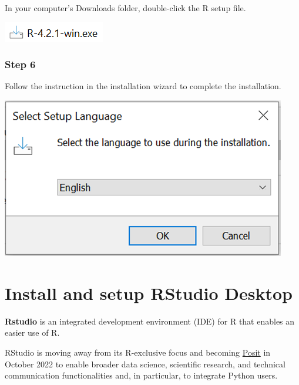 \documentclass[
  letterpaper,
  DIV=11,
  numbers=noendperiod,
  oneside]{scrreprt}
\begin{document}
In your computer's Downloads folder, double-click the R setup file.

\includegraphics{./images/paste-FD7C97A4.png}

\hypertarget{step-6}{%
\subsubsection{Step 6}\label{step-6}}

Follow the instruction in the installation wizard to complete the
installation.

\includegraphics{./images/paste-0F242DBF.png}

\hypertarget{sec-RStudio-installation}{%
\section{Install and setup RStudio
Desktop}\label{sec-RStudio-installation}}

\textbf{Rstudio} is an integrated development environment (IDE) for R
that enables an easier use of R.

\begin{tcolorbox}[enhanced jigsaw, colbacktitle=quarto-callout-note-color!10!white, titlerule=0mm, breakable, opacityback=0, opacitybacktitle=0.6, left=2mm, coltitle=black, colback=white, title=\textcolor{quarto-callout-note-color}{\faInfo}\hspace{0.5em}{Note}, rightrule=.15mm, colframe=quarto-callout-note-color-frame, toprule=.15mm, bottomtitle=1mm, toptitle=1mm, arc=.35mm, bottomrule=.15mm, leftrule=.75mm]
RStudio is moving away from its R-exclusive focus and becoming
\href{https://posit.co/}{Posit} in October 2022 to enable broader data
science, scientific research, and technical communication
functionalities and, in particular, to integrate Python users.
\end{tcolorbox}
\end{document}
